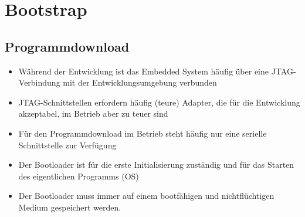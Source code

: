 \section{Bootstrap}
\subsection{Programmdownload }
\begin{itemize}
	\item Während der Entwicklung ist das Embedded System häufig über eine JTAG-Verbindung mit der 
	      Entwicklungsumgebung verbunden 
	\item JTAG-Schnittstellen erfordern häufig (teure) Adapter, die für die Entwicklung akzeptabel, 
	      im Betrieb aber zu teuer sind
	\item Für den Programmdownload im Betrieb steht häufig nur eine serielle Schnittstelle zur Verfügung
	\item Der Bootloader ist für die erste Initialisierung zuständig und für das Starten des eigentlichen
	      Programms (OS)
  \item Der Bootloader muss immer auf einem bootfähigen und nichtflüchtigen Medium gespeichert werden.
\end{itemize}
